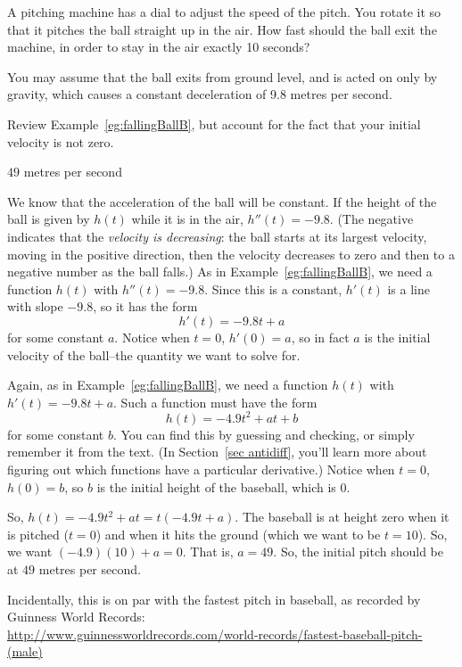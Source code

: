 \begin{question}
A pitching machine has a dial to adjust the speed of the pitch. You rotate it so that it pitches the ball straight up in the air. How fast should the ball exit the machine, in order to stay in the air exactly 10 seconds?

You may assume that the ball exits from ground level, and is acted on only by gravity, which causes a constant deceleration of 9.8 metres per second.
\end{question}
\begin{hint}
Review Example~\ref*{eg:fallingBallB}, but account for the fact that your initial velocity is not zero.
\end{hint}
\begin{answer}
$49$ metres per second
\end{answer}
\begin{solution}
We know that the acceleration of the ball will be constant. If the height of the ball is given by $h(t)$ while it is in the air, $h''(t)=-9.8$. (The negative indicates that the \emph{velocity is decreasing}: the ball starts at its largest velocity, moving in the positive direction, then the velocity decreases to zero and then to a negative number as the ball falls.) As in Example~\ref*{eg:fallingBallB}, we need a function $h(t)$ with $h''(t)=-9.8$. Since this is a constant, $h'(t)$ is a line with slope $-9.8$, so it has the form \[h'(t)=-9.8t+a\] for some constant $a$. Notice when $t=0$, $h'(0)=a$, so in fact $a$ is the initial velocity of the ball--the quantity we want to solve for.

Again, as in Example~\ref*{eg:fallingBallB}, we need a function $h(t)$ with $h'(t)=-9.8t+a$. Such a function must have the form \[h(t)=-4.9t^2+at+b\] for some constant $b$. You can find this by guessing and checking, or simply remember it from the text. (In Section~\ref*{sec antidiff}, you'll learn more about figuring out which functions have a particular derivative.) Notice when $t=0$, $h(0)=b$, so $b$ is the initial height of the baseball, which is 0.

So, $h(t)=-4.9t^2+at = t(-4.9t+a)$. The baseball is at height zero when it is pitched ($t=0$) and when it hits the ground (which we want to be $t=10$). So, we want $(-4.9)(10)+a=0$. That is, $a=49$. So, the initial pitch should be at $49$ metres per second.

Incidentally, this is on par with the fastest pitch in baseball, as recorded by Guinness World Records:\\ \small\url{http://www.guinnessworldrecords.com/world-records/fastest-baseball-pitch-(male)}
\end{solution}



